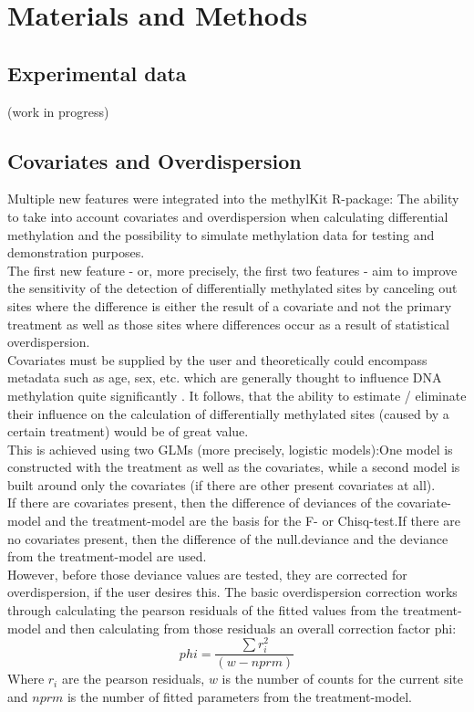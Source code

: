 \section{Materials and Methods}
\subsection{Experimental data}

(work in progress)

\subsection{Covariates and Overdispersion}

Multiple new features were integrated into the methylKit R-package: The ability to take into account covariates and overdispersion when calculating differential methylation and the possibility to simulate methylation data for testing and demonstration purposes.\\
The first new feature - or, more precisely, the first two features - aim to  improve the sensitivity of the detection of differentially methylated sites by canceling out sites where the difference is either the result of a covariate and not the primary treatment as well as those sites where differences occur as a result of statistical overdispersion.\\
Covariates must be supplied by the user and theoretically could encompass metadata such as age, sex, etc. which are generally thought to influence DNA methylation quite significantly \cite{24561809}. It follows, that the ability to estimate / eliminate their influence on the calculation of differentially methylated sites (caused by a certain treatment) would be of great value.\\
This is achieved using two GLMs (more precisely, logistic models):One model is constructed with the treatment as well as the covariates, while a second model is built around only the covariates (if there are other present covariates at all).\\
If there are covariates present, then the difference of deviances of the covariate-model and the treatment-model are the basis for the F- or Chisq-test.If there are no covariates present, then the difference of the null.deviance and the deviance from the treatment-model are used.\\
However, before those deviance values are tested, they are corrected for overdispersion, if the user desires this. The basic overdispersion correction works through calculating the pearson residuals of the fitted values from the treatment-model and then calculating from those residuals an overall correction factor phi:
\[phi = \frac{\sum{r_{i}^2}}{(w - nprm)}\]
Where $r_{i}$ are the pearson residuals, $w$ is the number of counts for the current site and $nprm$ is the number of fitted parameters from the treatment-model.


